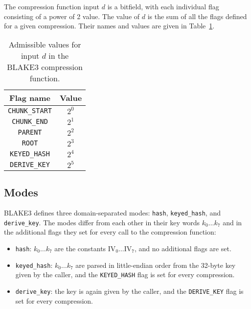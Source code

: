 \documentclass[11pt,notitlepage,a4paper]{article}
\newcommand{\IV}{\text{IV}}
\begin{document}
The compression function input $d$ is a bitfield, with each individual flag consisting of a power of 2 value. The value of $d$ is the sum of all the flags defined for a given
compression. Their names and values are given in Table~\ref{tab:flags}.
\begin{table}
  \centering
  \caption{Admissible values for input $d$ in the BLAKE3 compression function.}%
  \label{tab:flags}
  \begin{tabular}{cc}
    \toprule
    Flag name             & Value \\ \midrule
    \texttt{CHUNK\_START} & $2^0$ \\
    \texttt{CHUNK\_END}   & $2^1$ \\
    \texttt{PARENT}       & $2^2$ \\
    \texttt{ROOT}         & $2^3$ \\
    \texttt{KEYED\_HASH}  & $2^4$ \\
    \texttt{DERIVE\_KEY}  & $2^5$ \\
    \bottomrule
  \end{tabular}
\end{table}

\subsection{Modes}\label{sec:modes}

BLAKE3 defines three domain-separated modes: \texttt{hash},
\texttt{keyed\_hash}, and \texttt{derive\_key}. The modes differ from each
other in their key words $k_{0} \ldots k_{7}$ and in the additional flags they
set for every call to the compression function:

\begin{itemize}
  \item \texttt{hash}: $k_{0} \ldots k_{7}$ are the constants $\IV_0 \ldots \IV_7$, and no additional flags are set. 
  \item \texttt{keyed\_hash}: $k_{0} \ldots k_{7}$ are parsed in little-endian order from the 32-byte key given by the caller, and the \texttt{KEYED\_HASH} flag is set for every compression.
  \item \texttt{derive\_key}: the key is again given by the caller, and the \texttt{DERIVE\_KEY} flag is set for every compression.
\end{itemize}
\end{document}
